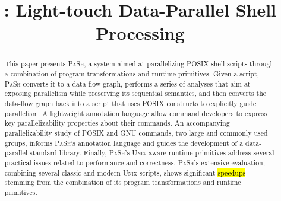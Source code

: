 \documentclass[sigplan, review, screen, anonymous]{acmart}
\title{\sys: Light-touch Data-Parallel Shell Processing}         %
\newcommand{\todo}[1]{\hl{#1}\xspace}
\newcommand{\kk}[1]{[{\color{magenta}kk: #1}]}
\newcommand{\sys}{{\scshape PaSh}\xspace}
\newcommand{\unix}{{\scshape Unix}\xspace}
\begin{document}




\begin{abstract}
This paper presents \sys, a system aimed at parallelizing POSIX shell scripts through a combination of program transformations and runtime primitives.
Given a script, \sys converts it to a data-flow graph, performs a series of analyses that aim at exposing parallelism while preserving its sequential semantics, and then converts the data-flow graph back into a script that uses POSIX constructs to explicitly guide parallelism.
A lightweight annotation language allow command developers to express key parallelizability properties about their commands.
An accompanying parallelizability study of POSIX and GNU commands, two large and commonly used groups, 
informs \sys's annotation language and guides the development of a data-parallel standard library.
Finally, \sys's \unix-aware runtime primitives address several practical issues related to performance and correctness.
\sys's extensive evaluation, combining several classic and modern \unix scripts, shows significant \todo{speedups} stemming from the combination of its program transformations and runtime primitives.
\end{abstract}
\end{document}
